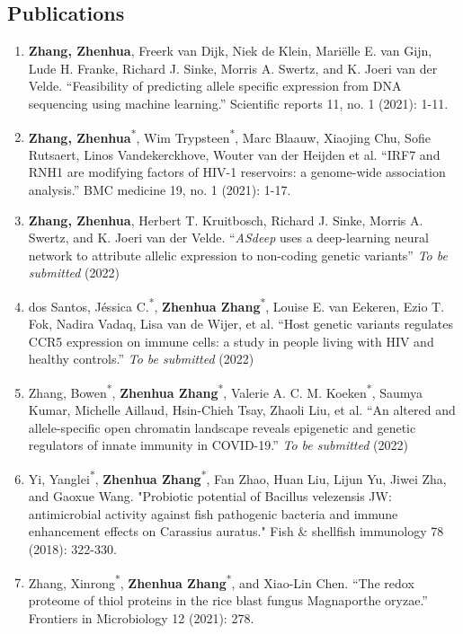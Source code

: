 \documentclass{book}
\begin{document}
\begin{refsection}
\section*{Publications}
\begin{enumerate}
  \item \textbf{Zhang, Zhenhua}, Freerk van Dijk, Niek de Klein, Mariëlle E. van Gijn, Lude H. Franke, Richard J. Sinke, Morris A. Swertz, and K. Joeri van der Velde. \enquote{Feasibility of predicting allele specific expression from DNA sequencing using machine learning.} Scientific reports 11, no. 1 (2021): 1-11.
  \item \textbf{Zhang, Zhenhua}\textsuperscript{*}, Wim Trypsteen\textsuperscript{*}, Marc Blaauw, Xiaojing Chu, Sofie Rutsaert, Linos Vandekerckhove, Wouter van der Heijden et al. \enquote{IRF7 and RNH1 are modifying factors of HIV-1 reservoirs: a genome-wide association analysis.} BMC medicine 19, no. 1 (2021): 1-17.
  \item \textbf{Zhang, Zhenhua}, Herbert T. Kruitbosch, Richard J. Sinke, Morris A. Swertz, and K. Joeri van der Velde. \enquote{\textit{ASdeep} uses a deep-learning neural network to attribute allelic expression to non-coding genetic variants} \textit{To be submitted} (2022)
  \item dos Santos, Jéssica C.\textsuperscript{*}, \textbf{Zhenhua Zhang}\textsuperscript{*}, Louise E. van Eekeren, Ezio T. Fok, Nadira Vadaq, Lisa van de Wijer, et al. \enquote{Host genetic variants regulates CCR5 expression on immune cells: a study in people living with HIV and healthy controls.} \textit{To be submitted} (2022)
  \item Zhang, Bowen\textsuperscript{*}, \textbf{Zhenhua Zhang}\textsuperscript{*}, Valerie A. C. M. Koeken\textsuperscript{*}, Saumya Kumar, Michelle Aillaud, Hsin-Chieh Tsay, Zhaoli Liu, et al. \enquote{An altered and allele-specific open chromatin landscape reveals epigenetic and genetic regulators of innate immunity in COVID-19.} \textit{To be submitted} (2022)
  \item Yi, Yanglei\textsuperscript{*}, \textbf{Zhenhua Zhang}\textsuperscript{*}, Fan Zhao, Huan Liu, Lijun Yu, Jiwei Zha, and Gaoxue Wang. "Probiotic potential of Bacillus velezensis JW: antimicrobial activity against fish pathogenic bacteria and immune enhancement effects on Carassius auratus." Fish \& shellfish immunology 78 (2018): 322-330.
  \item Zhang, Xinrong\textsuperscript{*}, \textbf{Zhenhua Zhang}\textsuperscript{*}, and Xiao-Lin Chen. \enquote{The redox proteome of thiol proteins in the rice blast fungus Magnaporthe oryzae.} Frontiers in Microbiology 12 (2021): 278.

\end{enumerate}
\end{refsection}
\end{document}
